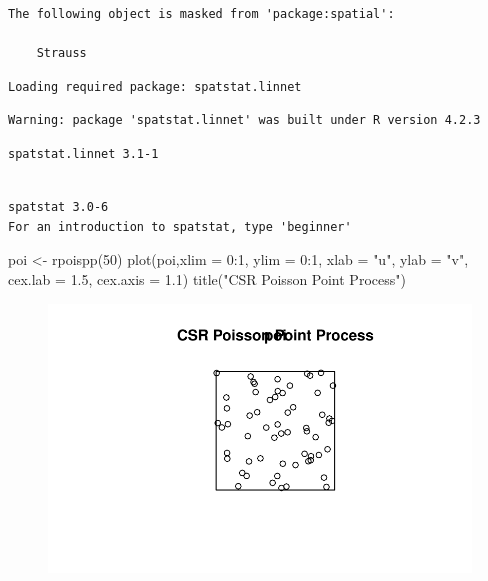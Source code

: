 \documentclass[
  letterpaper,
  DIV=11,
  numbers=noendperiod]{scrartcl}
\newenvironment{Shaded}{\begin{snugshade}}{\end{snugshade}}
\newcommand{\AttributeTok}[1]{\textcolor[rgb]{0.40,0.45,0.13}{#1}}
\newcommand{\DecValTok}[1]{\textcolor[rgb]{0.68,0.00,0.00}{#1}}
\newcommand{\FloatTok}[1]{\textcolor[rgb]{0.68,0.00,0.00}{#1}}
\newcommand{\FunctionTok}[1]{\textcolor[rgb]{0.28,0.35,0.67}{#1}}
\newcommand{\NormalTok}[1]{\textcolor[rgb]{0.00,0.23,0.31}{#1}}
\newcommand{\OtherTok}[1]{\textcolor[rgb]{0.00,0.23,0.31}{#1}}
\newcommand{\SpecialCharTok}[1]{\textcolor[rgb]{0.37,0.37,0.37}{#1}}
\newcommand{\StringTok}[1]{\textcolor[rgb]{0.13,0.47,0.30}{#1}}
\begin{document}
\begin{verbatim}
The following object is masked from 'package:spatial':

    Strauss
\end{verbatim}

\begin{verbatim}
Loading required package: spatstat.linnet
\end{verbatim}

\begin{verbatim}
Warning: package 'spatstat.linnet' was built under R version 4.2.3
\end{verbatim}

\begin{verbatim}
spatstat.linnet 3.1-1
\end{verbatim}

\begin{verbatim}

spatstat 3.0-6 
For an introduction to spatstat, type 'beginner' 
\end{verbatim}

\begin{Shaded}
\begin{Highlighting}[]
\NormalTok{poi }\OtherTok{\textless{}{-}} \FunctionTok{rpoispp}\NormalTok{(}\DecValTok{50}\NormalTok{)}
\FunctionTok{plot}\NormalTok{(poi,}\AttributeTok{xlim =} \DecValTok{0}\SpecialCharTok{:}\DecValTok{1}\NormalTok{, }\AttributeTok{ylim =} \DecValTok{0}\SpecialCharTok{:}\DecValTok{1}\NormalTok{, }\AttributeTok{xlab =} \StringTok{"u"}\NormalTok{, }\AttributeTok{ylab =} \StringTok{"v"}\NormalTok{, }
     \AttributeTok{cex.lab =} \FloatTok{1.5}\NormalTok{, }\AttributeTok{cex.axis =} \FloatTok{1.1}\NormalTok{)}
\FunctionTok{title}\NormalTok{(}\StringTok{"CSR Poisson Point Process"}\NormalTok{)}
\end{Highlighting}
\end{Shaded}

\begin{figure}[H]

{\centering \includegraphics{robby_homework_1_files/figure-pdf/unnamed-chunk-5-1.pdf}

}

\end{figure}
\end{document}
